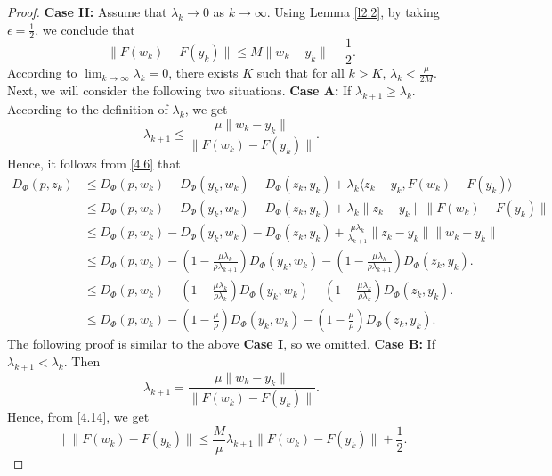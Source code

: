\documentclass[hidelinks,11 pt]{article}
\numberwithin{equation}{section}
\theoremstyle{definition}  %
\numberwithin{equation}{section}
\numberwithin{theorem}{section}
\begin{document}
\begin{proof}
\vskip 2mm 
\textbf{Case II:} Assume that $\lambda_{k}\to 0$ as $k\to\infty$. Using Lemma \ref{l2.2}, by taking $\epsilon=\frac{1}{2}$, we conclude that 
\begin{equation*}
    \|F(w_{k})-F(y_{k})\|\leq M\|w_{k}-y_{k}\|+\frac{1}{2}. \tag{4.14}\label{4.14}
\end{equation*}
According to $\lim_{k\to\infty}\lambda_{k} = 0$, there exists $K$ such that for all $k>K$, $\lambda_{k}<\frac{\mu}{2M}$. Next, we will consider the following two situations.
\vskip 2mm 
\textbf{Case A:} If $\lambda_{k+1}\geq \lambda_{k}$. According to the definition of $\lambda_{k}$, we get 
\begin{equation*}
    \lambda_{k+1}\leq \frac{\mu \|w_{k}-y_{k}\|}{  \|F(w_{k})-F(y_{k})\|}. 
\end{equation*}
Hence, it follows from \eqref{4.6} that 
\begin{align*}
    D_{\Phi}(p, z_k) 
    &\leq D_{\Phi}(p, w_k) - D_{\Phi}(y_k, w_k) - D_{\Phi}(z_k, y_k) + \lambda_k \langle z_k - y_k, F(w_k) - F(y_k) \rangle\\
    &\leq D_{\Phi}(p, w_k) - D_{\Phi}(y_k, w_k) - D_{\Phi}(z_k, y_k) + \lambda_k \| z_k - y_k\| \|F(w_k) - F(y_k)\|\\
    & \leq D_{\Phi}(p, w_k) - D_{\Phi}(y_k, w_k) - D_{\Phi}(z_k, y_k) + \frac{\mu\lambda_{k}}{\lambda_{k+1}} \| z_k - y_k\| \|w_k - y_k\|\\
    & \leq D_{\Phi}(p, w_k) -\left(1-\frac{\mu\lambda_{k}}{\rho\lambda_{k+1}}\right) D_{\Phi}(y_k, w_k) -\left(1-\frac{\mu\lambda_{k}}{\rho\lambda_{k+1}}\right) D_{\Phi}(z_k, y_k).\\
    & \leq D_{\Phi}(p, w_k) -\left(1-\frac{\mu\lambda_{k}}{\rho\lambda_{k}}\right) D_{\Phi}(y_k, w_k) -\left(1-\frac{\mu\lambda_{k}}{\rho\lambda_{k}}\right) D_{\Phi}(z_k, y_k).\\
    & \leq D_{\Phi}(p, w_k) -\left(1-\frac{\mu}{\rho}\right) D_{\Phi}(y_k, w_k) -\left(1-\frac{\mu}{\rho}\right) D_{\Phi}(z_k, y_k).
\end{align*}
The following proof is similar to the above \textbf{Case I}, so we omitted.
\vskip 2mm 
\textbf{Case B:} If $\lambda_{k+1}< \lambda_{k}$. Then 
\begin{equation*}
    \lambda_{k+1}= \frac{\mu \|w_{k}-y_{k}\|}{  \|F(w_{k})-F(y_{k})\|}. 
\end{equation*}
Hence, from \eqref{4.14}, we get 
\begin{equation*}
    \|\|F(w_{k})-F(y_{k})\|\leq \frac{M}{\mu}\lambda_{k+1}\|F(w_{k})-F(y_{k})\|+\frac{1}{2}.

\end{equation*}
\end{proof}
\end{document}
